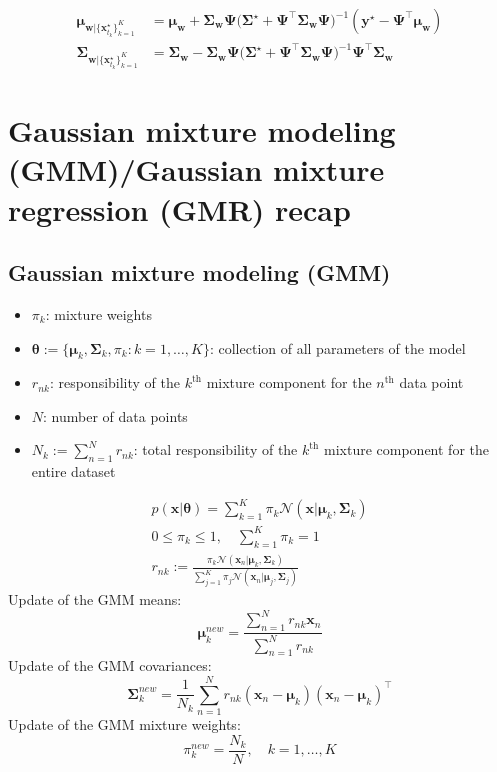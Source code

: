 \documentclass{article}
\begin{document}
\begin{align}
\bm{\mu}_{\bm{w}|\{\bm{x}_{t_k}^\star\}_{k=1}^K} &= \bm{\mu_w} + \bm{\Sigma_w}\bm{\Psi} \Big(\bm{\Sigma}^\star + \bm{\Psi}^\top \bm{\Sigma_w}\bm{\Psi} \Big)^{-1} (\bm{y}^\star - \bm{\Psi}^\top \bm{\mu_w})\\
\bm{\Sigma}_{\bm{w}|\{\bm{x}_{t_k}^\star\}_{k=1}^K} &= \bm{\Sigma_w} - \bm{\Sigma_w}\bm{\Psi} \Big(\bm{\Sigma}^\star + \bm{\Psi}^\top \bm{\Sigma_w}\bm{\Psi} \Big)^{-1} \bm{\Psi}^\top \bm{\Sigma_w}
\end{align}


\section{Gaussian mixture modeling (GMM)/Gaussian mixture regression (GMR) recap}
\subsection{Gaussian mixture modeling (GMM)}
\begin{itemize}
  \item $\pi_{k}$: mixture weights
  \item $\bm{\theta} := \{\bm{\mu}_{k}, \bm{\Sigma}_{k}, \pi_{k}: k=1, \dots, K\}$: collection of all parameters of the model
  \item $r_{nk}$: responsibility of the $k^{\text{th}}$ mixture component for the $n^{\text{th}}$ data point
  \item $N$: number of data points
  \item $N_{k} := \sum^{N}_{n=1} r_{nk}$: total responsibility of the $k^{\text{th}}$ mixture component for the entire dataset
\end{itemize}
\begin{gather}
  p(\bm{x}|\bm{\theta}) = \sum^{K}_{k=1} \pi_{k}  \mathcal{N}(\bm{x}|\bm{\mu}_{k}, \bm{\Sigma}_{k})\\
  0 \leq \pi_{k} \leq 1, \quad \sum^{K}_{k=1} \pi_{k} = 1\\
  r_{nk} := \frac{\pi_{k}  \mathcal{N}(\bm{x}_{n}|\bm{\mu}_{k}, \bm{\Sigma}_{k})}{\sum^{K}_{j=1} \pi_{j}  \mathcal{N}(\bm{x}_{n}|\bm{\mu}_{j}, \bm{\Sigma}_{j})}
\end{gather}
Update of the GMM means:
\begin{equation}
  \bm{\mu}_{k}^{new} = \frac{\sum_{n=1}^{N}r_{nk}\bm{x}_{n}}{\sum_{n=1}^{N}r_{nk}}
\end{equation}
Update of the GMM covariances:
\begin{equation}
  \bm{\Sigma}_{k}^{new} = \frac{1}{N_{k}} \sum^{N}_{n=1} r_{nk} (\bm{x}_{n} - \bm{\mu}_{k})(\bm{x}_{n} - \bm{\mu}_{k})^{\top}
\end{equation}
Update of the GMM mixture weights:
\begin{equation}
  \pi_{k}^{new} = \frac{N_{k}}{N}, \quad k=1, \dots, K
\end{equation}
\end{document}
